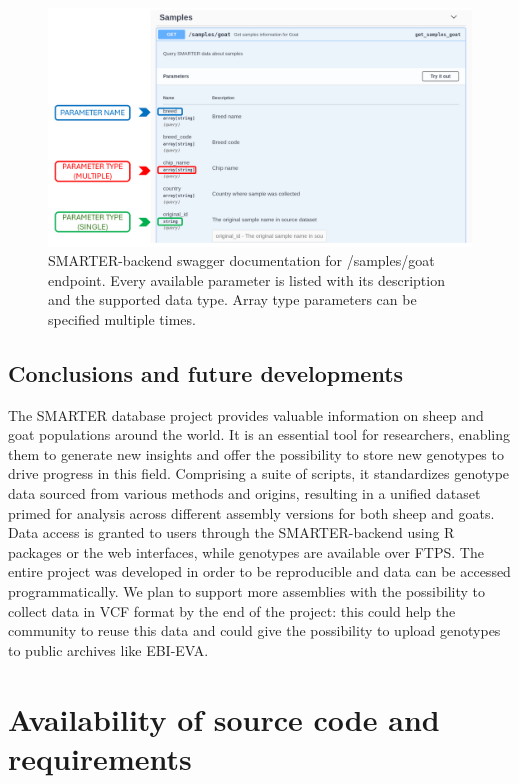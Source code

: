 \documentclass[a4paper,num-refs,gigabyte]{oup-contemporary}
\begin{document}
\begin{figure}
\centering
\includegraphics[width=.95\textwidth]{endpoints.png}
\caption{SMARTER-backend swagger documentation for /samples/goat endpoint. Every available parameter is listed
with its description and the supported data type. Array type parameters can be specified multiple times.}
\label{fig:endpoint}
\end{figure}

\subsection{Conclusions and future developments}
The SMARTER database project provides valuable information on sheep and goat populations around the world. It is an essential tool for researchers, enabling them to generate new insights and offer the possibility to store new genotypes to drive progress in this field. Comprising a suite of scripts, it standardizes genotype data sourced from various methods and origins, resulting in a unified dataset primed for analysis across different assembly versions for both sheep and goats. Data access is granted to users through the SMARTER-backend using R packages or the web interfaces, while genotypes are available over FTPS. The entire project was developed in order to be reproducible and data can be accessed programmatically. We plan to support more assemblies with the possibility to collect data in VCF format by the end of the project: this could help the community to reuse this data and could give the possibility to upload genotypes to public archives like EBI-EVA.

\section{Availability of source code and requirements}
\end{document}
